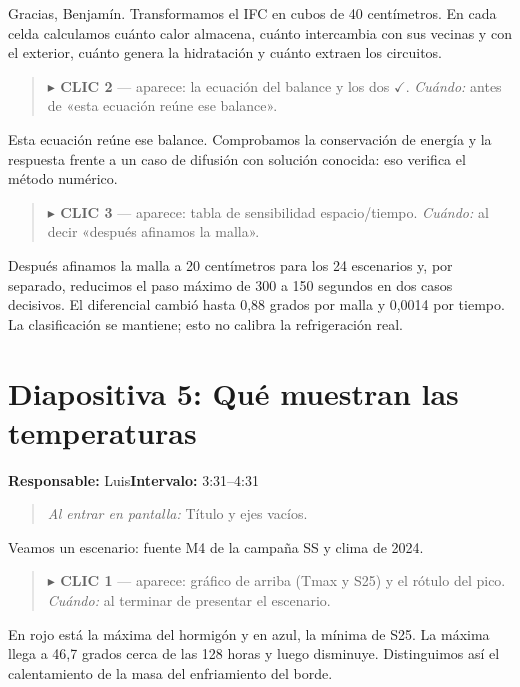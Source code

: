 \documentclass[11pt,a4paper]{article}
\newenvironment{indicacion}{\begin{quote}\small\color{grisindicacion}}{\end{quote}}
\newcommand{\lamina}[4]{%
  \section*{\color{petroleo}Diapositiva #1: #2}%
  \textbf{Responsable:} #3\hfill\textbf{Intervalo:} #4\par
}
\begin{document}
Gracias, Benjamín. Transformamos el IFC en cubos de 40 centímetros. En cada celda calculamos cuánto calor almacena, cuánto intercambia con sus vecinas y con el exterior, cuánto genera la hidratación y cuánto extraen los circuitos.



\begin{indicacion}\textbf{\ensuremath{\blacktriangleright} CLIC 2} --- aparece: la ecuación del balance y los dos \ensuremath{\checkmark}. \emph{Cuándo:} antes de «esta ecuación reúne ese balance».\end{indicacion}


Esta ecuación reúne ese balance. Comprobamos la conservación de energía y la respuesta frente a un caso de difusión con solución conocida: eso verifica el método numérico.



\begin{indicacion}\textbf{\ensuremath{\blacktriangleright} CLIC 3} --- aparece: tabla de sensibilidad espacio/tiempo. \emph{Cuándo:} al decir «después afinamos la malla».\end{indicacion}


Después afinamos la malla a 20 centímetros para los 24 escenarios y, por separado, reducimos el paso máximo de 300 a 150 segundos en dos casos decisivos. El diferencial cambió hasta 0,88 grados por malla y 0,0014 por tiempo. La clasificación se mantiene; esto no calibra la refrigeración real.



\clearpage

\lamina{5}{Qué muestran las temperaturas}{Luis}{3:31--4:31}

\begin{indicacion}\emph{Al entrar en pantalla:} Título y ejes vacíos.\end{indicacion}


Veamos un escenario: fuente M4 de la campaña SS y clima de 2024.



\begin{indicacion}\textbf{\ensuremath{\blacktriangleright} CLIC 1} --- aparece: gráfico de arriba (Tmax y S25) y el rótulo del pico. \emph{Cuándo:} al terminar de presentar el escenario.\end{indicacion}


En rojo está la máxima del hormigón y en azul, la mínima de S25. La máxima llega a 46,7 grados cerca de las 128 horas y luego disminuye. Distinguimos así el calentamiento de la masa del enfriamiento del borde.
\end{document}
